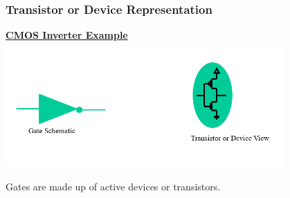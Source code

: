 \documentclass[compress]{beamer}
\begin{document}
\begin{frame}
	\frametitle{Transistor or Device Representation}
		\begin{center}
			\textbf{\underline{CMOS Inverter Example}}
			\includegraphics[width=0.8\textwidth]{Inverter}
		\end{center}
			
		\begin{alertblock}	
			
			Gates are made up of active devices or transistors.
		\end{alertblock}
\end{frame}
\end{document}
